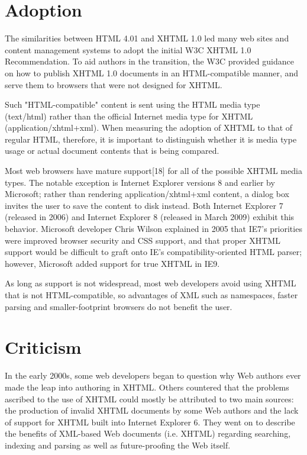\section{Adoption}

The similarities between HTML 4.01 and XHTML 1.0 led many web sites and content management systems to adopt the initial W3C XHTML 1.0 Recommendation. To aid authors in the transition, the W3C provided guidance on how to publish XHTML 1.0 documents in an HTML-compatible manner, and serve them to browsers that were not designed for XHTML.


Such "HTML-compatible" content is sent using the HTML media type (text/html) rather than the official Internet media type for XHTML (application/xhtml+xml). When measuring the adoption of XHTML to that of regular HTML, therefore, it is important to distinguish whether it is media type usage or actual document contents that is being compared.

Most web browsers have mature support[18] for all of the possible XHTML media types. The notable exception is Internet Explorer versions 8 and earlier by Microsoft; rather than rendering application/xhtml+xml content, a dialog box invites the user to save the content to disk instead. Both Internet Explorer 7 (released in 2006) and Internet Explorer 8 (released in March 2009) exhibit this behavior. Microsoft developer Chris Wilson explained in 2005 that IE7’s priorities were improved browser security and CSS support, and that proper XHTML support would be difficult to graft onto IE’s compatibility-oriented HTML parser; however, Microsoft added support for true XHTML in IE9.

As long as support is not widespread, most web developers avoid using XHTML that is not HTML-compatible, so advantages of XML such as namespaces, faster parsing and smaller-footprint browsers do not benefit the user.


\section{Criticism}

In the early 2000s, some web developers began to question why Web authors ever made the leap into authoring in XHTML. Others countered that the problems ascribed to the use of XHTML could mostly be attributed to two main sources: the production of invalid XHTML documents by some Web authors and the lack of support for XHTML built into Internet Explorer 6. They went on to describe the benefits of XML-based Web documents (i.e. XHTML) regarding searching, indexing and parsing as well as future-proofing the Web itself.


